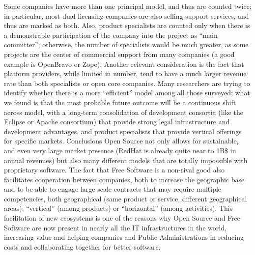Some companies have more than one principal model, and thus are counted twice;
in particular, most dual licensing companies are also selling support services,
and thus are marked as both. Also, product specialists are counted only when
there is a demonstrable participation of the company into the project as “main
committer”; otherwise, the number of specialists would be much greater, as some
projects are the center of commercial support from many companies (a good
example is OpenBravo or Zope).
Another relevant consideration is the fact that platform providers, while
limited in number, tend to have a much larger revenue rate than both specialists
or open core companies. Many researchers are trying to identify whether there is
a more “efficient” model among all those surveyed; what we found is that the
most probable future outcome will be a continuous shift across model, with a
long-term consolidation of development consortia (like the Eclipse or Apache
consortium) that provide strong legal infrastructure and development advantages,
and product specialists that provide vertical offerings for specific markets. 
Conclusions
Open Source not only allows for sustainable, and even very large market presence
(RedHat is already quite near to 1B\$ in annual revenues) but also many
different models that are totally impossible with proprietary software. The fact
that Free Software is a non-rival good also facilitates cooperation between
companies, both to increase the geographic base and to be able to engage large
scale contracts that may require multiple competencies, both geographical (same
product or service, different geographical areas); “vertical” (among products)
or “horizontal” (among activities). This facilitation of new ecosystems is one
of the reasons why Open Source and Free Software are now present in nearly all
the IT infrastructures in the world, increasing value and helping companies and
Public Administrations in reducing costs and collaborating together for better
software.

